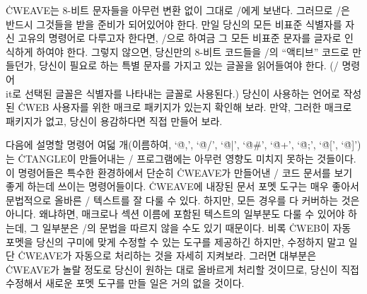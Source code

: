 \more
\.{CWEAVE}는 8-비트 문자들을 아무런 변환 없이 그대로 \TEX/에게 보낸다.
그러므로 \TEX/은 반드시 그것들을 받을 준비가 되어있어야 한다.
만일 당신의 모든 비표준 식별자를 자신 고유의 명령어로 다루고자 한다면,
\TEX/으로 하여금 그 모든 비표준 문자를 글자로 인식하게 하여야 한다.
그렇지 않으면, 당신만의 8-비트 코드들을 \TEX/의 ``액티브'' 코드로
만들던가, 당신이 필요로 하는 특별 문자를 가지고 있는 글꼴을 읽어들여야 한다.
(\TEX/ 명령어 \.{\\it}로 선택된 글꼴은 식별자를 나타내는 글꼴로
사용된다.) 당신이 사용하는 언어로 작성된 \.{CWEB} 사용자를 위한 매크로
패키지가 있는지 확인해 보라. 만약, 그러한 매크로 패키지가 없고, 당신이
용감하다면 직접 만들어 보라.

\subsec
다음에 설명할 명령어 여덟 개(이름하여, `\.{@,}', `\.{@/}', `\.{@|}', `\.{@\#}',
`\.{@+}', `\.{@;}', `\.{@[}', `\.{@]}')는 \.{CTANGLE}이 만들어내는
\CEE/ 프로그램에는 아무런 영향도 미치지 못하는 것들이다. 이 명령어들은
특수한 환경하에서 단순히 \.{CWEAVE}가 만들어낸 \CEE/ 코드 문서를 보기
좋게 하는데 쓰이는 명령어들이다.
\.{CWEAVE}에 내장된 문서 포멧 도구는 매우 좋아서 문법적으로 올바른
\CEE/ 텍스트를 잘 다룰 수 있다. 하지만, 모든 경우를 다 커버하는 것은
아니다. 왜냐하면, 매크로나 섹션 이름에 포함된 텍스트의 일부분도 다룰 수
있어야 하는데, 그 일부분은 \CEE/의 문법을 따르지 않을 수도 있기 때문이다.
비록 \.{CWEB}이 자동 포멧을 당신의 구미에 맞게 수정할 수 있는 도구를
제공하긴 하지만, 수정하지 말고 일단 \.{CWEAVE}가 자동으로 처리하는
것을 자세히 지켜보라. 그러면 대부분은 \.{CWEAVE}가 놀랄 정도로
당신이 원하는 대로 올바르게 처리할 것이므로, 당신이 직접 수정해서
새로운 포멧 도구를 만들 일은 거의 없을 것이다.

